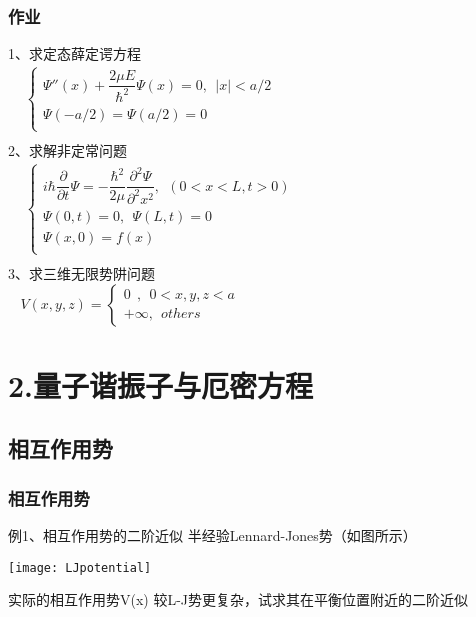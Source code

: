 \begin{frame}
	\frametitle{作业}
	1、求定态薛定谔方程\\ 
	$\begin{array}{lllllllll}
		& \begin{cases}
			\Psi'' (x) +\dfrac{2\mu E}{\hbar ^2} \Psi(x) =0,~~ |x|<a/2 \\
			\Psi(-a/2) =\Psi(a/2) =0\\
		\end{cases}\\	
	\end{array}$ \\ 
	2、求解非定常问题\\
	$\begin{array}{lllllllll}
		& \begin{cases}
			i\hbar \dfrac{\partial }{\partial t} \Psi = -\dfrac{\hbar^2}{2\mu } \dfrac{\partial ^2 \Psi }{\partial ^2  x ^2 } , ~~ (0<x<L, t>0) \\
			\Psi (0,t) =0, ~~ \Psi (L,t) =0 \\
			\Psi (x,0) =f(x)  \\
		\end{cases}\\
	\end{array}$ \\ 
	3、求三维无限势阱问题\\
	$ ~~~~	V(x,y,z)=\left \{ 
	\begin{array}{cccc}
		0	~~ ,~~ 0<x,y,z<a \\  
		+\infty ,~~others\
	\end{array}
	\right. $ 	
\end{frame}

\section{2.量子谐振子与厄密方程}

\subsection{相互作用势}

\begin{frame}
	\frametitle{相互作用势}
	\begin{exampleblock} {例1、相互作用势的二阶近似}
		半经验Lennard-Jones势（如图所示）\\
	   \centerline{\texttt{[image: LJpotential]}}  
		实际的相互作用势V(x) 较L-J势更复杂，试求其在平衡位置附近的二阶近似	
	\end{exampleblock}
\end{frame}

